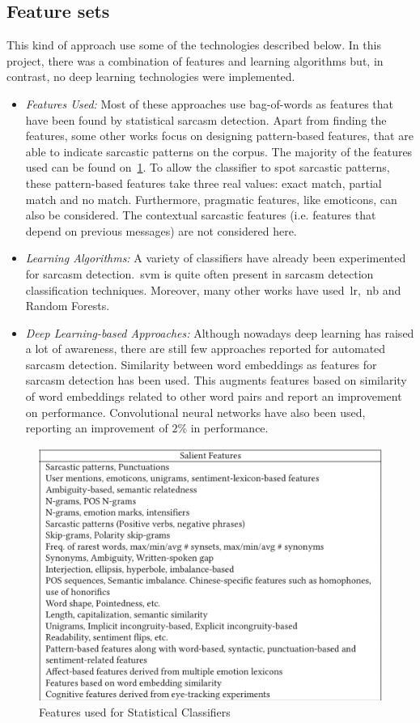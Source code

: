 \subsection{Feature sets \cite{joshi2017automatic}}
This kind of approach use some of the technologies described below. In this project, there was a combination of features and learning algorithms but, in contrast, no deep learning technologies were implemented.
\begin{itemize}
	\item \textit{Features Used:} Most of these approaches use bag-of-words as features that have been found by statistical sarcasm detection. Apart from finding the features, some other works focus on designing pattern-based features, that are able to indicate sarcastic patterns on the corpus. The majority of the features used can be found on~\cref{fig:featused}. To allow the classifier to spot sarcastic patterns, these pattern-based features take three real values: exact match, partial match and no match. Furthermore, pragmatic features, like emoticons, can also be considered. The contextual sarcastic features (i.e. features that depend on previous messages) are not considered here.
	\item \textit{Learning Algorithms:} A variety of classifiers have already been experimented for sarcasm detection.~\acf{svm} is quite often present in sarcasm detection classification techniques. Moreover, many other works have used~\acf{lr},~\acf{nb} and Random Forests.
	\item \textit{Deep Learning-based Approaches:} Although nowadays deep learning has raised a lot of awareness, there are still few approaches reported for automated sarcasm detection. Similarity between word embeddings as features for sarcasm detection has been used. This augments features based on similarity of word embeddings related to other word pairs and report an improvement on performance. Convolutional neural networks have also been used, reporting an improvement of $2\%$ in performance.
\end{itemize}
\begin{figure}
\centering
\includegraphics[scale=0.25]{img/features.jpeg}
\caption{Features used for Statistical Classifiers~\cite{joshi2017automatic}}
\label{fig:featused}
\end{figure}
